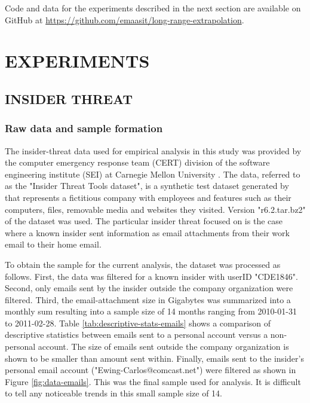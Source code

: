 \documentclass[letterpaper]{article}
\begin{document}
Code and data for the experiments described in the next section are available on GitHub at \href{https://github.com/emaasit/long-range-extrapolation}{https://github.com/emaasit/long-range-extrapolation}.

\section{EXPERIMENTS}\label{experiments}

\subsection{INSIDER THREAT}
\subsubsection{Raw data and sample formation}

The insider-threat data used for empirical analysis in this study was provided by the computer emergency response team (CERT) division of the software engineering institute (SEI) at Carnegie Mellon University \citep{CERT}. The data, referred to as the "Insider Threat Tools dataset", is a synthetic test dataset generated by \cite{glasser2013bridging} that represents a fictitious company with employees and features such as their computers, files, removable media and websites they visited. Version "r6.2.tar.bz2" of the dataset was used. The particular insider threat focused on is the case where a known insider sent information as email attachments from their work email to their home email.

To obtain the sample for the current analysis, the dataset was processed as follows. First, the data was filtered for a known insider with userID "CDE1846". Second, only emails sent by the insider outside the company organization were filtered. Third, the email-attachment size in Gigabytes was summarized into a monthly sum resulting into a sample size of 14 months ranging from 2010-01-31 to 2011-02-28. Table \ref{tab:descriptive-stats-emails} shows a comparison of descriptive statistics between emails sent to a personal account versus a non-personal account. The size of emails sent outside the company organization is shown to be smaller than amount sent within. Finally, emails sent to the insider's personal email account ("Ewing-Carlos@comcast.net") were filtered as shown in Figure \ref{fig:data-emails}. This was the final sample used for analysis. It is difficult to tell any noticeable trends in this small sample size of 14.
\end{document}
